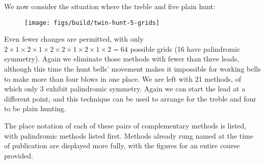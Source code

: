 We now consider the situation where the treble and five plain hunt:

\begin{figure}[h]
  \centering
  \texttt{[image: figs/build/twin-hunt-5-grids]}
\end{figure}

Even fewer changes are permitted, with only
\(2\times1\times2\times1\times2\times2\times1\times2\times1\times2 = 64\)
possible grids (16 have palindromic symmetry).
Again we eliminate those methods with fewer than three leads,
although this time the hunt bells’ movement makes it impossible for working
bells to make more than four blows in one place.
We are left with 21 methods, of which only 3 exhibit palindromic symmetry.
Again we can start the lead at a different point, and this technique can be used
to arrange for the treble and four to be plain hunting.

The place notation of each of these pairs of complementary methods is listed,
with palindromic methods listed first.
Methods already rung named at the time of publication are displayed more fully,
with the figures for an entire course provided.
